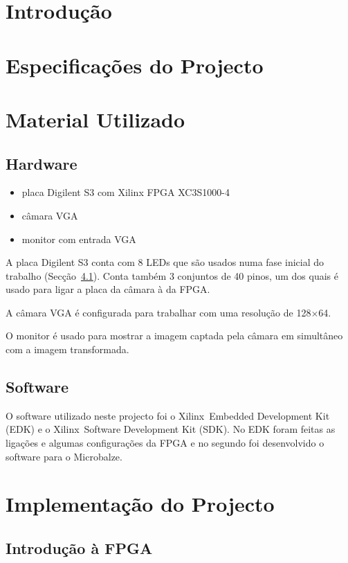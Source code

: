 \documentclass[a4paper]{article}
\begin{document}


\tableofcontents
\pagebreak

\section{Introdução}


\section{Especificações do Projecto}

\section{Material Utilizado}
\subsection*{Hardware}
\begin{itemize}
\item placa Digilent S3 com Xilinx FPGA XC3S1000-4
\item câmara VGA
\item monitor com entrada VGA
\end{itemize}

A placa Digilent S3 conta com 8 LEDs que são usados numa fase inicial do trabalho (Secção~\ref{subsec:LEDs}). Conta também 3 conjuntos de 40 pinos, um dos quais é usado para ligar a placa da câmara à da FPGA.

A câmara VGA é configurada para trabalhar com uma resolução de 128$\times$64.

O monitor é usado para mostrar a imagem captada pela câmara em simultâneo com a imagem transformada.

\subsection*{Software}
O software utilizado neste projecto foi o Xilinx\textregistered\ Embedded Development Kit (EDK) e o Xilinx\textregistered\ Software Development Kit (SDK). No EDK foram feitas as ligações e algumas configurações da FPGA e no segundo foi desenvolvido o software para o Microbalze.

\section{Implementação do Projecto}
\subsection{Introdução à FPGA}
\label{subsec:LEDs}
\end{document}
